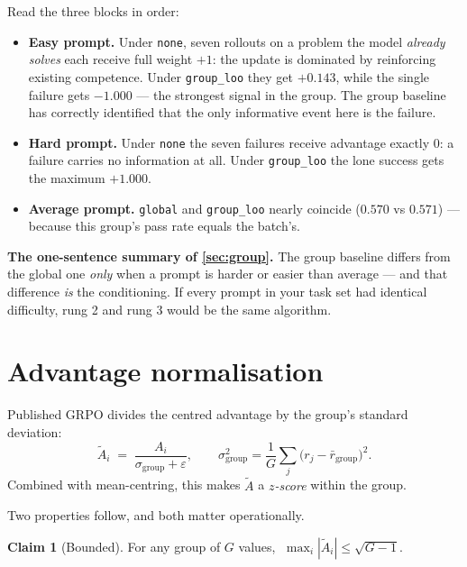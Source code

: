 \documentclass[11pt,letterpaper]{article}
\theoremstyle{definition}
\newtheorem{claim}{Claim}[section]
\newcommand{\Adv}{A}
\begin{document}
Read the three blocks in order:

\begin{itemize}
  \item \textbf{Easy prompt.} Under \texttt{none}, seven rollouts on a problem the model
        \emph{already solves} each receive full weight $+1$: the update is dominated by reinforcing
        existing competence. Under \texttt{group\_loo} they get $+0.143$, while the single failure
        gets $-1.000$ --- the strongest signal in the group. The group baseline has correctly
        identified that the only informative event here is the failure.
  \item \textbf{Hard prompt.} Under \texttt{none} the seven failures receive advantage exactly
        $0$: a failure carries no information at all. Under \texttt{group\_loo} the lone success gets
        the maximum $+1.000$.
  \item \textbf{Average prompt.} \texttt{global} and \texttt{group\_loo} nearly coincide
        ($0.570$ vs $0.571$) --- because this group's pass rate equals the batch's.
\end{itemize}

\begin{aside}
\textbf{The one-sentence summary of \cref{sec:group}.} The group baseline differs from the global one
\emph{only} when a prompt is harder or easier than average --- and that difference \emph{is} the
conditioning. If every prompt in your task set had identical difficulty, rung 2 and rung 3 would be
the same algorithm.
\end{aside}

\section{Advantage normalisation}
\label{sec:norm}

Published GRPO divides the centred advantage by the group's standard deviation:
\begin{equation}
  \tilde{\Adv}_i \;=\; \frac{\Adv_i}{\sigma_{\text{group}} + \varepsilon},
  \qquad \sigma^2_{\text{group}} = \frac{1}{G}\sum_j \big(r_j - \bar{r}_{\text{group}}\big)^2 .
  \label{eq:znorm}
\end{equation}
Combined with mean-centring, this makes $\tilde{\Adv}$ a \emph{$z$-score} within the group.

Two properties follow, and both matter operationally.

\begin{claim}[Bounded]
\label{claim:bound}
For any group of $G$ values, $\;\max_i |\tilde{\Adv}_i| \le \sqrt{G-1}$.
\end{claim}
\end{document}
